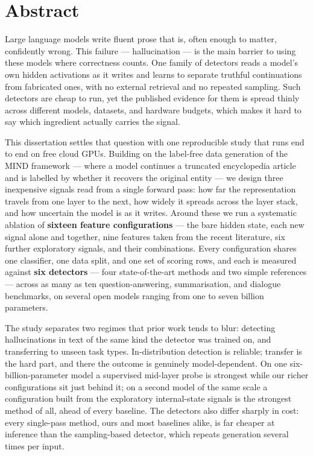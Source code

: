 \chapter*{Abstract}

Large language models write fluent prose that is, often enough to matter, confidently
wrong. This failure --- hallucination --- is the main barrier to using these models where
correctness counts. One family of detectors reads a model's own hidden activations as it
writes and learns to separate truthful continuations from fabricated ones, with no external
retrieval and no repeated sampling. Such detectors are cheap to run, yet the published
evidence for them is spread thinly across different models, datasets, and hardware budgets,
which makes it hard to say which ingredient actually carries the signal.

This dissertation settles that question with one reproducible study that runs end to end on
free cloud GPUs. Building on the label-free data generation of the MIND framework --- where a
model continues a truncated encyclopedia article and is labelled by whether it recovers the
original entity --- we design three inexpensive signals read from a single forward pass: how
far the representation travels from one layer to the next, how widely it spreads across the
layer stack, and how uncertain the model is as it writes. Around these we run a systematic
ablation of \textbf{sixteen feature configurations} --- the bare hidden state, each new
signal alone and together, nine features taken from the recent literature, six further
exploratory signals, and their combinations. Every configuration shares one classifier, one
data split, and one set of scoring rows, and each is measured against \textbf{six detectors}
--- four state-of-the-art methods and two simple references --- across as many as ten
question-answering, summarisation, and dialogue benchmarks, on several open models ranging
from one to seven billion parameters.

The study separates two regimes that prior work tends to blur: detecting hallucinations in
text of the same kind the detector was trained on, and transferring to unseen task types.
In-distribution detection is reliable; transfer is the hard part, and there the outcome is
genuinely model-dependent. On one six-billion-parameter model a supervised mid-layer probe
is strongest while our richer configurations sit just behind it; on a second model of the
same scale a configuration built from the exploratory internal-state signals is the
strongest method of all, ahead of every baseline. The detectors also differ sharply in cost:
every single-pass method, ours and most baselines alike, is far cheaper at inference than
the sampling-based detector, which repeats generation several times per input.

